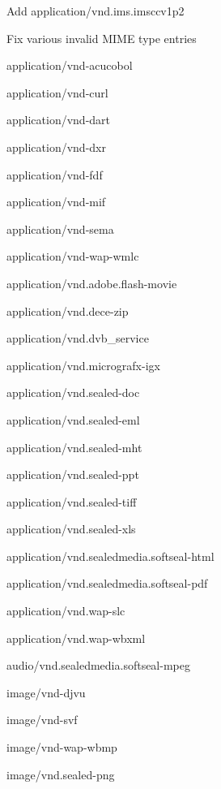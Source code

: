 \begin{DoxyItemize}
\item Add {\ttfamily application/vnd.\+ims.\+imsccv1p2}
\item Fix various invalid M\+I\+M\+E type entries
\begin{DoxyItemize}
\item {\ttfamily application/vnd-\/acucobol}
\item {\ttfamily application/vnd-\/curl}
\item {\ttfamily application/vnd-\/dart}
\item {\ttfamily application/vnd-\/dxr}
\item {\ttfamily application/vnd-\/fdf}
\item {\ttfamily application/vnd-\/mif}
\item {\ttfamily application/vnd-\/sema}
\item {\ttfamily application/vnd-\/wap-\/wmlc}
\item {\ttfamily application/vnd.\+adobe.\+flash-\/movie}
\item {\ttfamily application/vnd.\+dece-\/zip}
\item {\ttfamily application/vnd.\+dvb\+\_\+service}
\item {\ttfamily application/vnd.\+micrografx-\/igx}
\item {\ttfamily application/vnd.\+sealed-\/doc}
\item {\ttfamily application/vnd.\+sealed-\/eml}
\item {\ttfamily application/vnd.\+sealed-\/mht}
\item {\ttfamily application/vnd.\+sealed-\/ppt}
\item {\ttfamily application/vnd.\+sealed-\/tiff}
\item {\ttfamily application/vnd.\+sealed-\/xls}
\item {\ttfamily application/vnd.\+sealedmedia.\+softseal-\/html}
\item {\ttfamily application/vnd.\+sealedmedia.\+softseal-\/pdf}
\item {\ttfamily application/vnd.\+wap-\/slc}
\item {\ttfamily application/vnd.\+wap-\/wbxml}
\item {\ttfamily audio/vnd.\+sealedmedia.\+softseal-\/mpeg}
\item {\ttfamily image/vnd-\/djvu}
\item {\ttfamily image/vnd-\/svf}
\item {\ttfamily image/vnd-\/wap-\/wbmp}
\item {\ttfamily image/vnd.\+sealed-\/png}

\end{DoxyItemize}
\end{DoxyItemize}
